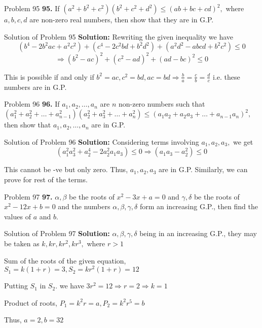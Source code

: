 \documentclass[aspectratio=1610,8pt]{beamer}
\begin{document}
\begin{frame}{Problem 95}
  \textbf{95.} If $(a^2 + b^2 + c^2)(b^2 + c^2 + d^2) \leq (ab + bc + cd)^2,$ where $a, b, c, d$ are non-zero real numbers, then
  show that they are in G.P.
\end{frame}
\begin{frame}{Solution of Problem 95}
  \textbf{Solution:} Rewriting the given inequality we have
  $$(b^4 - 2b^2ac + a^2c^2) + (c^4 - 2c^2bd + b^2d^2) + (a^2d^2 - abcd + b^2c^2)\leq 0$$
  $$\Rightarrow (b^2 - ac)^2 + (c^2 - ad)^2 + (ad - bc)^2\leq 0$$

  This is possible if and only if $b^2 = ac, c^2 = bd, ac = bd \Rightarrow \frac{b}{a} = \frac{c}{b} = \frac{d}{c}$ i.e. these
  numbers are in G.P.
\end{frame}
\begin{frame}{Problem 96}
  \textbf{96.} If $a_1, a_2, \ldots, a_n$ are $n$ non-zero numbers such that $(a_1^2 + a_2^2 + \ldots + a_{n - 1}^2)(a_2^2 + a_3^2
  + \ldots + a_n^2) \leq (a_1a_2 + a_2a_3 + \ldots + a_{n - 1}a_n)^2,$ then show that $a_1, a_2, \ldots, a_n$ are in G.P.
\end{frame}
\begin{frame}{Solution of Problem 96}
  \textbf{Solution:} Considering terms involving $a_1, a_2, a_3,$ we get
  $$(a_1^2a_3^2 + a_2^4 - 2a_2^2a_1a_3) \leq 0 \Rightarrow (a_1a_3 - a_2^2)\leq 0$$

  This cannot be -ve but only zero. Thus, $a_1, a_2, a_3$ are in G.P. Similarly, we can prove for rest of the terms.
\end{frame}
\begin{frame}{Problem 97}
  \textbf{97.} $\alpha, \beta$ be the roots of $x^2 - 3x + a = 0$ and $\gamma, \delta$ be the roots of $x^2 - 12x + b = 0$ and the
  numbers $\alpha, \beta, \gamma, \delta$ form an increasing G.P., then find the values of $a$ and $b.$
\end{frame}
\begin{frame}{Solution of Problem 97}
  \textbf{Solution:} $\alpha, \beta, \gamma, \delta$ being in an increasing G.P., they may be taken as $k, kr, kr^2, kr^3,$ where
  $r > 1$

  Sum of the roots of the given equation, $S_1 = k(1 + r) = 3, S_2 = kr^2(1 + r) = 12$

  Putting $S_1$ in $S_2.$ we have $3r^2 = 12 \Rightarrow r = 2\Rightarrow k = 1$

  Product of roots, $P_1 = k^2r = a, P_2 = k^2r^5 = b$

  Thus, $a = 2, b = 32$
\end{frame}
\end{document}
